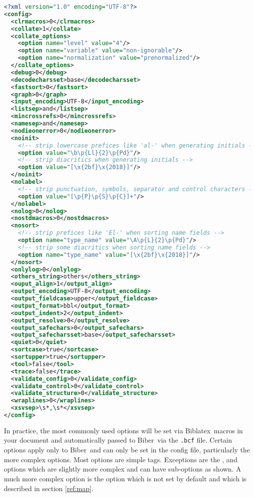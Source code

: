 \documentclass{ltxdockit}
\newcommand*{\biber}{Biber\xspace}
\newcommand*{\biblatex}{Biblatex\xspace}
\begin{document}
\begin{lstlisting}[language=xml]
<?xml version="1.0" encoding="UTF-8"?>
<config>
  <clrmacros>0</clrmacros>
  <collate>1</collate>
  <collate_options>
    <option name="level" value="4"/>
    <option name="variable" value="non-ignorable"/>
    <option name="normalization" value="prenormalized"/>
  </collate_options>
  <debug>0</debug>
  <decodecharsset>base</decodecharsset>
  <fastsort>0</fastsort>
  <graph>0</graph>
  <input_encoding>UTF-8</input_encoding>
  <listsep>and</listsep>
  <mincrossrefs>0</mincrossrefs>
  <namesep>and</namesep>
  <nodieonerror>0</nodieonerror>
  <noinit>
    <!-- strip lowercase prefices like 'al-' when generating initials -->
    <option value="\b\p{Ll}{2}\p{Pd}"/>
    <!-- strip diacritics when generating initials -->
    <option value="[\x{2bf}\x{2018}]"/>
  </noinit>
  <nolabel>
    <!-- strip punctuation, symbols, separator and control characters -->
    <option value="[\p{P}\p{S}\p{C}]+"/> 
  </nolabel>
  <nolog>0</nolog>
  <nostdmacros>0</nostdmacros>
  <nosort>
    <!-- strip prefices like 'El-' when sorting name fields -->
    <option name="type_name" value="\A\p{L}{2}\p{Pd}"/>
    <!-- strip some diacritics when sorting name fields -->
    <option name="type_name" value="[\x{2bf}\x{2018}]"/>
  </nosort>
  <onlylog>0</onlylog>
  <others_string>others</others_string>
  <ouput_align>1</output_align>
  <output_encoding>UTF-8</output_encoding>
  <output_fieldcase>upper</output_fieldcase>
  <output_format>bbl</output_format>
  <output_indent>2</output_indent>
  <output_resolve>0</output_resolve>
  <output_safechars>0</output_safechars>
  <output_safecharsset>base</output_safecharsset>
  <quiet>0</quiet>
  <sortcase>true</sortcase>
  <sortupper>true</sortupper>
  <tool>false</tool>
  <trace>false</trace>
  <validate_config>0</validate_config>
  <validate_control>0</validate_control>
  <validate_structure>0</validate_structure>
  <wraplines>0</wraplines>
  <xsvsep>\s*,\s*</xsvsep>
</config>
\end{lstlisting}

\noindent In practice, the most commonly used options will be set via
\biblatex\ macros in your document and automatically passed to \biber\
via the \verb+.bcf+ file. Certain options apply only to \biber\ and can
only be set in the config file, particularly the more complex
options. Most options are simple tags. Exceptions are the
,  and  options which are slightly
more complex and can have sub-options as shown. A much more complex
option is the \opt{sourcemap} option which is not set by default and
which is described in section \ref{ref:map}.
\end{document}
